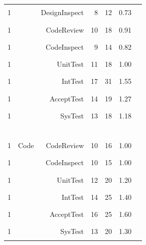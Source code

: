 \documentclass[smallcondensed]{svjour3}
\begin{document}
\begin{figure}
\begin{center}
\begin{tabular}{c|lr|rr|rl}
1 &   &   DesignInspect   & 8 &   12 & 0.73 & \textcolor{black}{\rule{7mm}{2mm}}  \\
1 &   &   CodeReview      & 10 &   18 & 0.91 & \textcolor{black}{\rule{9mm}{2mm}}  \\
1 &   &   CodeInspect     & 9 &  14 & 0.82 & \textcolor{black}{\rule{8mm}{2mm}}  \\
1 &   &   UnitTest        & 11 &   18 & 1.00 & \textcolor{black}{\rule{10mm}{2mm}}  \\
1 &   &   IntTest         & 17 &   31 & 1.55 & \textcolor{black}{\rule{15mm}{2mm}}  \\
1 &   &   AcceptTest      & 14 &   19 & 1.27 & \textcolor{black}{\rule{12mm}{2mm}}  \\
1 &   &   SysTest         & 13 &   18 & 1.18 & \textcolor{black}{\rule{12mm}{2mm}}  \\
\hline\multicolumn{7}{c}{~}  \\
1 &  Code   &   CodeReview    & 10 &  16 & 1.00 & \textcolor{black}{\rule{10mm}{2mm}}  \\
1 &    &   CodeInspect   & 10 &   15 & 1.00 & \textcolor{black}{\rule{10mm}{2mm}}  \\
1 &   &   UnitTest      & 12 &   20 & 1.20 & \textcolor{black}{\rule{12mm}{2mm}}  \\
1 &    &   IntTest       & 14 &   25 & 1.40 & \textcolor{black}{\rule{14mm}{2mm}}  \\
1 &    &   AcceptTest    & 16 &   25 & 1.60 & \textcolor{black}{\rule{16mm}{2mm}}  \\
1 &   &   SysTest       & 13 &   20 & 1.30 & \textcolor{black}{\rule{13mm}{2mm}}  \\


\end{tabular}
\end{center}
\end{figure}
\end{document}
